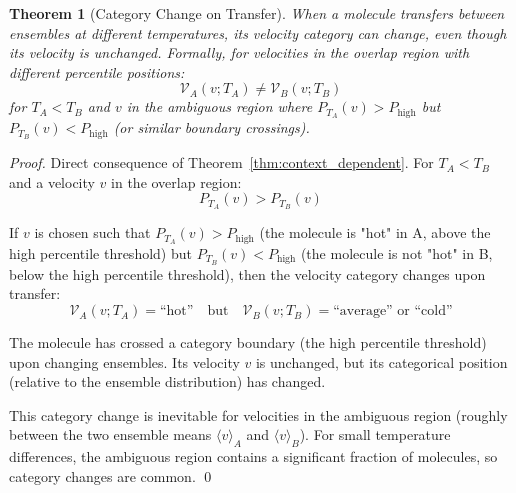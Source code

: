 \documentclass[12pt,a4paper]{article}
\newtheorem{theorem}{Theorem}[section]
\theoremstyle{definition}
\theoremstyle{remark}
\begin{document}
\begin{theorem}[Category Change on Transfer]
\label{thm:category_change}
When a molecule transfers between ensembles at different temperatures, its velocity category can change, even though its velocity is unchanged. Formally, for velocities in the overlap region with different percentile positions:
\begin{equation}
\mathcal{V}_A(v; T_A) \neq \mathcal{V}_B(v; T_B)
\label{eq:category_change}
\end{equation}
for $T_A < T_B$ and $v$ in the ambiguous region where $P_{T_A}(v) > P_{\text{high}}$ but $P_{T_B}(v) < P_{\text{high}}$ (or similar boundary crossings).
\end{theorem}

\begin{proof}
Direct consequence of Theorem~\ref{thm:context_dependent}. For $T_A < T_B$ and a velocity $v$ in the overlap region:
\begin{equation}
P_{T_A}(v) > P_{T_B}(v)
\end{equation}

If $v$ is chosen such that $P_{T_A}(v) > P_{\text{high}}$ (the molecule is "hot" in A, above the high percentile threshold) but $P_{T_B}(v) < P_{\text{high}}$ (the molecule is not "hot" in B, below the high percentile threshold), then the velocity category changes upon transfer:
\begin{equation}
\mathcal{V}_A(v; T_A) = \text{``hot''} \quad \text{but} \quad \mathcal{V}_B(v; T_B) = \text{``average'' or ``cold''}
\end{equation}

The molecule has crossed a category boundary (the high percentile threshold) upon changing ensembles. Its velocity $v$ is unchanged, but its categorical position (relative to the ensemble distribution) has changed.

This category change is inevitable for velocities in the ambiguous region (roughly between the two ensemble means $\langle v \rangle_A$ and $\langle v \rangle_B$). For small temperature differences, the ambiguous region contains a significant fraction of molecules, so category changes are common. \qed
\end{proof}
\end{document}
